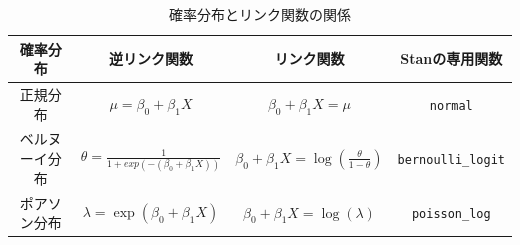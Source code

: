\begin{table}[ht]
	\centering
	\caption{確率分布とリンク関数の関係}
	\begin{tabular}{cccc}
		確率分布    & 逆リンク関数                                          & リンク関数                                                             & Stanの専用関数              \\\hline
		正規分布    & $\mu = \beta_0 + \beta_1 X$                     & $\beta_0 + \beta_1X=\mu$                                          & \verb|normal|          \\
		ベルヌーイ分布 & $\theta = \frac{1}{1+exp(-(\beta_0+\beta_1X))}$ & $\beta_0 + \beta_1 X = \log\left(\frac{\theta}{1-\theta}\right) $ & \verb|bernoulli_logit| \\
		ポアソン分布  & $\lambda = \exp(\beta_0 + \beta_1 X)$           & $\beta_0 + \beta_1X = \log(\lambda)$                              & \verb|poisson_log|     \\\hline
	\end{tabular}
	\label{tbl::25_01}
\end{table}

